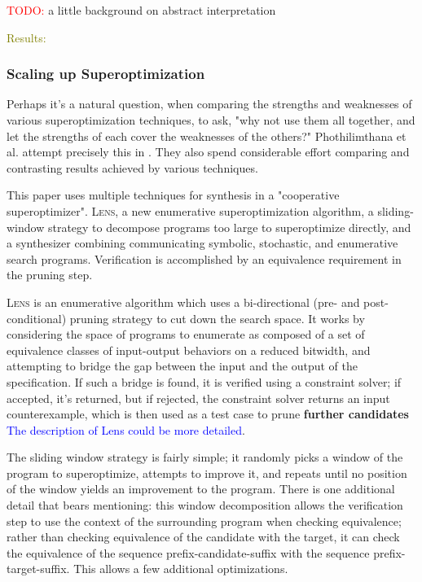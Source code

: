 \documentclass[12pt,twoside]{reedthesis}
\newcommand{\red}[1]{\textcolor{red}{#1}}
\newcommand{\green}[1]{\textcolor{olive}{#1}}
\newcommand{\comment}[2]{\textbf{#1} \textcolor{blue}{#2}}
\begin{document}
        \red{TODO:} a little background on abstract interpretation
            
        \green{
        Results: 
        }


    \subsubsection{Scaling up Superoptimization}
        Perhaps it's a natural question, when comparing the strengths and weaknesses of various superoptimization techniques, to ask, "why not use them all together, and let the strengths of each cover the weaknesses of the others?"
        Phothilimthana et al. attempt precisely this in \cite{phothilimthana2016scaling}.
        They also spend considerable effort comparing and contrasting results achieved by various techniques.
            
        This paper uses multiple techniques for synthesis in a "cooperative superoptimizer".
        \textsc{Lens}, a new enumerative superoptimization algorithm,
        a sliding-window strategy to decompose programs too large to superoptimize directly,
        and a synthesizer combining communicating symbolic, stochastic, and enumerative search programs.
        Verification is accomplished by an equivalence requirement in the pruning step.
            
        \textsc{Lens} is an enumerative algorithm which uses a bi-directional (pre- and post-conditional) pruning strategy to cut down the search space.
        It works by considering the space of programs to enumerate as composed of a set of equivalence classes of input-output behaviors on a reduced bitwidth, and attempting to bridge the gap between the input and the output of the specification.
        If such a bridge is found, it is verified using a constraint solver;
                if accepted, it's returned,
                but if rejected, the constraint solver returns an input counterexample,
            which is then used as a test case to prune \comment{further candidates}{The description of Lens could be more detailed}.

        The sliding window strategy is fairly simple; it randomly picks a window of the program to superoptimize, attempts to improve it, and repeats until no position of the window yields an improvement to the program.
        There is one additional detail that bears mentioning: 
            this window decomposition allows the verification step to use the context of the surrounding program when checking equivalence;
            rather than checking equivalence of the candidate with the target, it can check the equivalence of the sequence prefix-candidate-suffix with the sequence prefix-target-suffix.
        This allows a few additional optimizations.
\end{document}
